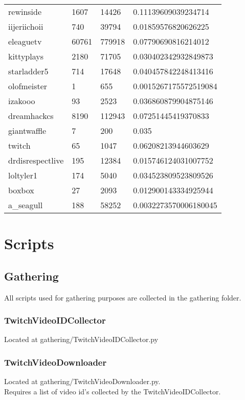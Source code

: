 \documentclass[final]{report} %
\begin{document}
\begin{appendices}
\begin{table}[h]
\begin{tabular}{llll}
rewinside        & 1607   & 14426   & 0.11139609039234714   \\
iijeriichoii     & 740    & 39794   & 0.01859576820626225   \\
eleaguetv        & 60761  & 779918  & 0.07790690816214012   \\
kittyplays       & 2180   & 71705   & 0.030402342932849873  \\
starladder5      & 714    & 17648   & 0.040457842248413416  \\
olofmeister      & 1      & 655     & 0.0015267175572519084 \\
izakooo          & 93     & 2523    & 0.036860879904875146  \\
dreamhackcs      & 8190   & 112943  & 0.07251445419370833   \\
giantwaffle      & 7      & 200     & 0.035                 \\
twitch           & 65     & 1047    & 0.06208213944603629   \\
drdisrespectlive & 195    & 12384   & 0.015746124031007752  \\
loltyler1        & 174    & 5040    & 0.034523809523809526  \\
boxbox           & 27     & 2093    & 0.012900143334925944  \\
a\_seagull       & 188    & 58252   & 0.0032273570006180045 \\
\end{tabular}
\end{table}

\pagebreak
\section{Scripts}

\subsection{Gathering}
All scripts used for gathering purposes are collected in the gathering folder.

\subsubsection{TwitchVideoIDCollector}
\label{script:twitch_video_id_collector}
Located at gathering/TwitchVideoIDCollector.py\\

\subsubsection{TwitchVideoDownloader}
\label{script:twitch_video_downloader}
Located at gathering/TwitchVideoDownloader.py.\\
Requires a list of video id's collected by the TwitchVideoIDCollector.


\end{appendices}
\end{document}
